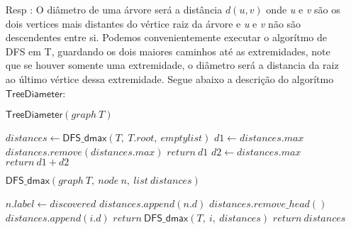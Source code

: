 \documentclass{homework}
\begin{document}
    \begin{enumerate}
        \item[Resp :] O diâmetro de uma árvore será a distância $d(u,v)$ onde \textit{u} e \textit{v} são os dois vertices mais distantes do vértice raiz da árvore e \textit{u} e \textit{v} não são descendentes entre si. Podemos convenientemente executar o algorítmo de DFS em T, guardando os dois maiores caminhos até as extremidades, note que se houver somente uma extremidade, o diâmetro será a distancia da raiz ao último vértice dessa extremidade. Segue abaixo a descrição do algorítmo $\mathsf{TreeDiameter}$:
        
\pagebreak

        $\mathsf{TreeDiameter}(graph\ T)$
			\begin{algorithmic}[1]
			    \State $distances \gets \mathsf{DFS\_dmax}(T,\ T.root,\ emptylist)$
			    \State $d1 \gets distances.max$
			    \State $distances.remove(distances.max)$
			        \State $return\ d1$
			    \EndIf
			    \State $d2 \gets distances.max$
			    \State $return\ d1+d2$
			\end{algorithmic}
		$\mathsf{DFS\_dmax}(graph\ T,\ node\ n,\ list\ distances)$
			\begin{algorithmic}[1]
			    \State $n.label \gets discovered$
			        \State $distances.append(n.d)$
			    \EndIf
			                \State $distances.remove\_head()$
			                \State $distances.append(i.d)$
			            \EndIf
			            \State $return\ \mathsf{DFS\_dmax}(T,\ i,\ distances)$
			        \EndIf
			    \EndFor
			    \State $return\ distances$
			\end{algorithmic}
    \end{enumerate}
\end{document}
